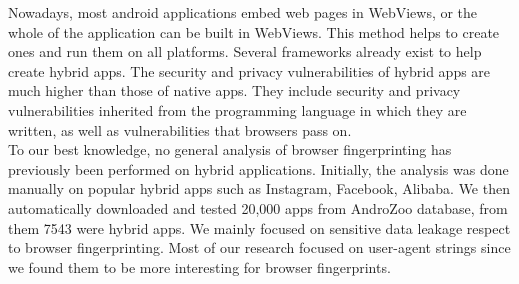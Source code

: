 Nowadays, most android applications embed web pages in WebViews, or the whole of the application can be built in WebViews. This method helps to create ones and run them on all platforms. Several frameworks already exist to help create hybrid apps. The security and privacy vulnerabilities of hybrid apps are much higher than those of native apps. They include security and privacy vulnerabilities inherited from the programming language in which they are written, as well as vulnerabilities that browsers pass on.  \\
 To our best knowledge, no general analysis of browser fingerprinting has previously been performed on hybrid applications. Initially, the analysis was done manually on popular hybrid apps such as Instagram, Facebook, Alibaba. We then automatically downloaded and tested 20,000 apps from AndroZoo database, from them  7543 were hybrid apps. We mainly focused on sensitive data leakage  respect to  browser fingerprinting. Most of our research focused on user-agent strings since we found them to be more interesting for browser fingerprints.
